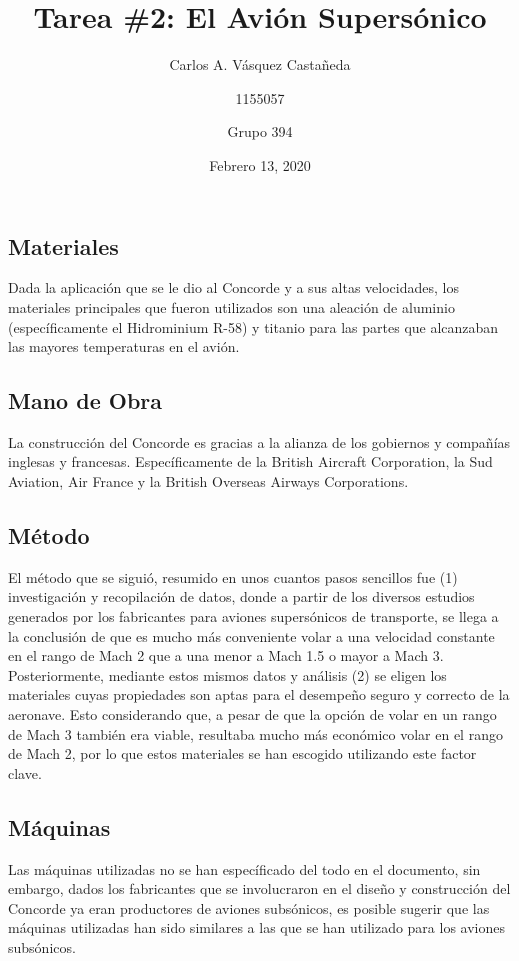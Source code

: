 \documentclass[12pt, letterpaper]{article}
\title{Tarea \#2: El Avión Supersónico}
\author{Carlos A. Vásquez Castañeda \and 1155057 \and Grupo 394}
\date{Febrero 13, 2020}
\begin{document}
\maketitle

\subsection*{Materiales}
Dada la aplicación que se le dio al Concorde y a sus altas velocidades, los materiales principales que fueron utilizados son una aleación de aluminio (específicamente el Hidrominium R-58) y titanio para las partes que alcanzaban las mayores temperaturas en el avión.

\subsection*{Mano de Obra}
La construcción del Concorde es gracias a la alianza de los gobiernos y compañías inglesas y francesas. Específicamente de la British Aircraft Corporation, la Sud Aviation, Air France y la British Overseas Airways Corporations.

\subsection*{Método}
El método que se siguió, resumido en unos cuantos pasos sencillos fue (1) investigación y recopilación de datos, donde a partir de los diversos estudios generados por los fabricantes para aviones supersónicos de transporte, se llega a la conclusión de que es mucho más conveniente volar a una velocidad constante en el rango de Mach 2 que a una menor a Mach 1.5 o mayor a Mach 3. Posteriormente, mediante estos mismos datos y análisis (2) se eligen los materiales cuyas propiedades son aptas para el desempeño seguro y correcto de la aeronave. Esto considerando que, a pesar de que la opción de volar en un rango de Mach 3 también era viable, resultaba mucho más económico volar en el rango de Mach 2, por lo que estos materiales se han escogido utilizando este factor clave.

\subsection*{Máquinas}
Las máquinas utilizadas no se han específicado del todo en el documento, sin embargo, dados los fabricantes que se involucraron en el diseño y construcción del Concorde ya eran productores de aviones subsónicos, es posible sugerir que las máquinas utilizadas han sido similares a las que se han utilizado para los aviones subsónicos.
\end{document}
